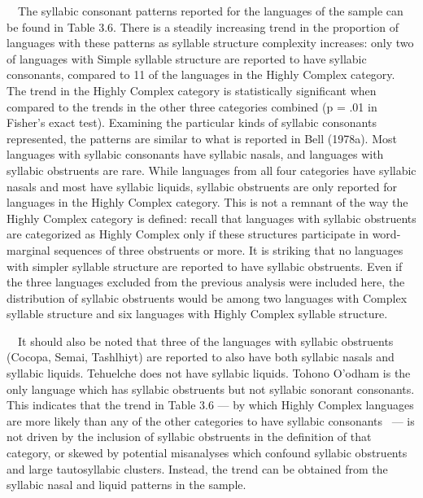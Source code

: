\documentclass[12pt]{article}
\newenvironment{styleBody}{\renewcommand\baselinestretch{1.0}\setlength\leftskip{0in}\setlength\rightskip{0in plus 1fil}\setlength\parindent{0in}\setlength\parfillskip{0pt plus 1fil}\setlength\parskip{0in plus 1pt}\writerlistparindent\writerlistleftskip\leavevmode\normalfont\normalsize\fontsize{11pt}{13.2pt}\selectfont\mdseries\upshape\writerlistlabel\ignorespaces}{\unskip\vspace{0in plus 1pt}\par}
\newcommand\writerlistleftskip{}
\newcommand\writerlistparindent{}
\newcommand\writerlistlabel{}
\begin{document}
\begin{styleBody}
\ \ The syllabic consonant patterns reported for the languages of the sample can be found in Table 3.6. There is a steadily increasing trend in the proportion of languages with these patterns as syllable structure complexity increases: only two of languages with Simple syllable structure are reported to have syllabic consonants, compared to 11 of the languages in the Highly Complex category. The trend in the Highly Complex category is statistically significant when compared to the trends in the other three categories combined (p = .01 in Fisher’s exact test). Examining the particular kinds of syllabic consonants represented, the patterns are similar to what is reported in Bell (1978a). Most languages with syllabic consonants have syllabic nasals, and languages with syllabic obstruents are rare. While languages from all four categories have syllabic nasals and most have syllabic liquids, syllabic obstruents are only reported for languages in the Highly Complex category. This is not a remnant of the way the Highly Complex category is defined: recall that languages with syllabic obstruents are categorized as Highly Complex only if these structures participate in word-marginal sequences of three obstruents or more. It is striking that no languages with simpler syllable structure are reported to have syllabic obstruents. Even if the three languages excluded from the previous analysis were included here, the distribution of syllabic obstruents would be among two languages with Complex syllable structure and six languages with Highly Complex syllable structure. 
\end{styleBody}

\begin{styleBody}
\ \ It should also be noted that three of the languages with syllabic obstruents (Cocopa, Semai, Tashlhiyt) are reported to also have both syllabic nasals and syllabic liquids. Tehuelche does not have syllabic liquids. Tohono O’odham is the only language which has syllabic obstruents but not syllabic sonorant consonants. This indicates that the trend in Table 3.6 — by which Highly Complex languages are more likely than any of the other categories to have syllabic consonants \ — is not driven by the inclusion of syllabic obstruents in the definition of that category, or skewed by potential misanalyses which confound syllabic obstruents and large tautosyllabic clusters. Instead, the trend can be obtained from the syllabic nasal and liquid patterns in the sample.
\end{styleBody}
\end{document}
